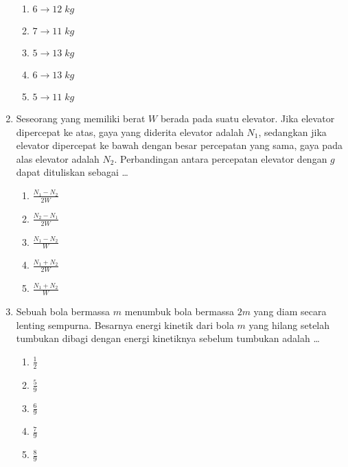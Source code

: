 \documentclass[A4,12PT, english, twocolumn]{journal}
\begin{document}
\begin{enumerate}
\begin{center}
\end{center}
    \begin{enumerate}
        \item $6 \to 12 \; kg$
        \item $7 \to 11 \; kg$
        \item $5 \to 13 \; kg$
        \item $6 \to 13 \; kg$
        \item $5 \to 11 \; kg$
    \end{enumerate}
   
\item Seseorang yang memiliki berat $W$ berada pada suatu elevator. Jika elevator dipercepat ke atas, gaya yang diderita elevator adalah $N_1$, sedangkan jika elevator dipercepat ke bawah dengan besar percepatan yang sama, gaya pada alas elevator adalah $N_2$. Perbandingan antara percepatan elevator dengan $g$ dapat dituliskan sebagai \dots
    \begin{enumerate}
        \item $\frac{N_1-N_2}{2W}$
        \item $\frac{N_2-N_1}{2W}$
        \item $\frac{N_1-N_2}{W}$
        \item $\frac{N_1+N_2}{2W}$
        \item $\frac{N_1+N_2}{W}$
    \end{enumerate}

\item Sebuah bola bermassa $m$ menumbuk bola bermassa $2m$ yang diam secara lenting sempurna. Besarnya energi kinetik dari bola $m$ yang hilang setelah tumbukan dibagi dengan energi kinetiknya sebelum tumbukan adalah \dots
    \begin{enumerate}
        \item $\frac{1}{2}$
        \item $\frac{5}{9}$
        \item $\frac{6}{9}$
        \item $\frac{7}{9}$
        \item $\frac{8}{9}$
    \end{enumerate}


\end{enumerate}
\end{document}
